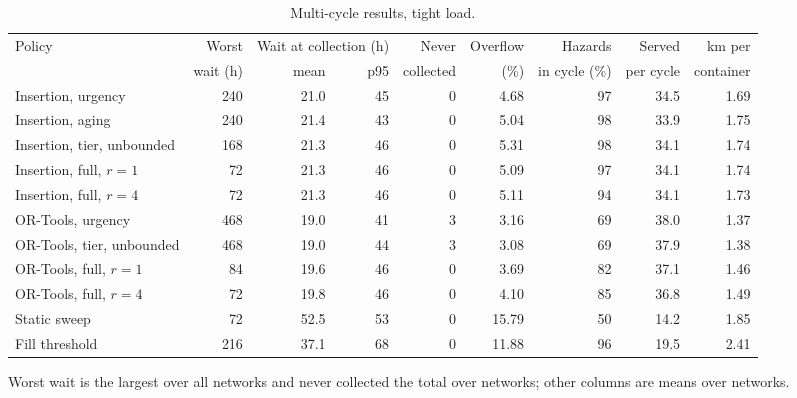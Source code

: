 \begin{table}[!htbp]
\caption{Multi-cycle results, tight load.}
\label{tab:rollout_tight}
\centering
\footnotesize
\setlength{\tabcolsep}{3pt}
\begin{tabular}{lrrrrrrrr}
\toprule
Policy & Worst & \multicolumn{2}{c}{Wait at collection (h)} & Never & Overflow & Hazards & Served & km per \\
\cmidrule(lr){3-4}
 & wait (h) & mean & p95 & collected & (\%) & in cycle (\%) & per cycle & container \\
\midrule
Insertion, urgency & 240 & 21.0 & 45 & 0 & 4.68 & 97 & 34.5 & 1.69 \\
Insertion, aging & 240 & 21.4 & 43 & 0 & 5.04 & 98 & 33.9 & 1.75 \\
Insertion, tier, unbounded & 168 & 21.3 & 46 & 0 & 5.31 & 98 & 34.1 & 1.74 \\
Insertion, full, $r = 1$ & 72 & 21.3 & 46 & 0 & 5.09 & 97 & 34.1 & 1.74 \\
Insertion, full, $r = 4$ & 72 & 21.3 & 46 & 0 & 5.11 & 94 & 34.1 & 1.73 \\
OR-Tools, urgency & 468 & 19.0 & 41 & 3 & 3.16 & 69 & 38.0 & 1.37 \\
OR-Tools, tier, unbounded & 468 & 19.0 & 44 & 3 & 3.08 & 69 & 37.9 & 1.38 \\
OR-Tools, full, $r = 1$ & 84 & 19.6 & 46 & 0 & 3.69 & 82 & 37.1 & 1.46 \\
OR-Tools, full, $r = 4$ & 72 & 19.8 & 46 & 0 & 4.10 & 85 & 36.8 & 1.49 \\
Static sweep & 72 & 52.5 & 53 & 0 & 15.79 & 50 & 14.2 & 1.85 \\
Fill threshold & 216 & 37.1 & 68 & 0 & 11.88 & 96 & 19.5 & 2.41 \\
\bottomrule
\end{tabular}
\par\smallskip\footnotesize Worst wait is the largest over all networks and never collected the total over networks; other columns are means over networks.
\end{table}
